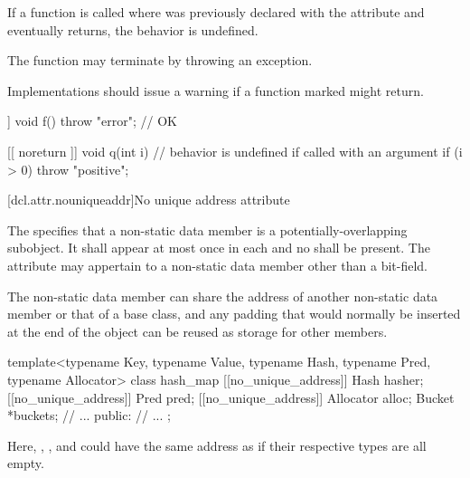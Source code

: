 \pnum
If a function  is called where  was previously declared with the 
attribute and  eventually returns, the behavior is undefined. \begin{note} The function may
terminate by throwing an exception. \end{note} \begin{note} Implementations should issue a
warning if a function marked \tcode{[[noreturn]]} might return. \end{note}

\pnum
\begin{example}
\begin{codeblock}
[[ noreturn ]] void f() {
  throw "error";                // OK
}

[[ noreturn ]] void q(int i) {  // behavior is undefined if called with an argument 
  if (i > 0)
    throw "positive";
}
\end{codeblock}
\end{example}

[dcl.attr.nouniqueaddr]{No unique address attribute}%

\pnum
The  
specifies that a non-static data member
is a potentially-overlapping subobject.
It shall appear at most once in each 
and no  shall be present.
The attribute may appertain to a non-static data member
other than a bit-field.

\pnum
\begin{note}
The non-static data member can share the address of
another non-static data member or that of a base class,
and any padding that would normally be inserted
at the end of the object
can be reused as storage for other members.
\end{note}
\begin{example}
\begin{codeblock}
template<typename Key, typename Value,
         typename Hash, typename Pred, typename Allocator>
class hash_map {
  [[no_unique_address]] Hash hasher;
  [[no_unique_address]] Pred pred;
  [[no_unique_address]] Allocator alloc;
  Bucket *buckets;
  // ...
public:
  // ...
};
\end{codeblock}
Here, , , and 
could have the same address as 
if their respective types are all empty.
\end{example}

